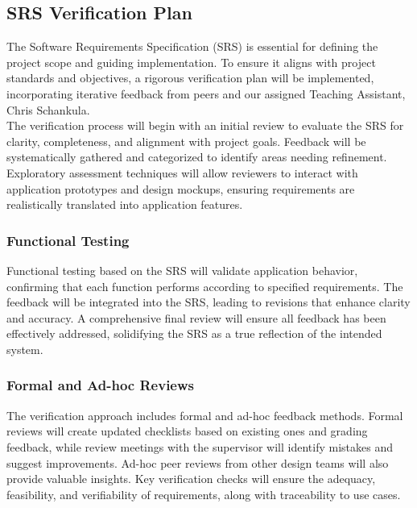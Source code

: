 \documentclass[12pt, titlepage]{article}
\begin{document}
\subsection{SRS Verification Plan}

The Software Requirements Specification (SRS) is essential for defining the project scope and guiding
implementation. To ensure it aligns with project standards and objectives, a rigorous verification
plan will be implemented, incorporating iterative feedback from peers and our assigned Teaching Assistant,
Chris Schankula.\\
\newline
The verification process will begin with an initial review to evaluate the SRS for
clarity, completeness, and alignment with project goals. Feedback will be systematically gathered and
categorized to identify areas needing refinement. Exploratory assessment techniques will allow reviewers
to interact with application prototypes and design mockups, ensuring requirements are realistically
translated into application features.

\subsubsection{Functional Testing}
Functional testing based on the SRS will validate application behavior, confirming that each function
performs according to specified requirements. The feedback will be integrated into the SRS, leading to
revisions that enhance clarity and accuracy. A comprehensive final review will ensure all feedback
has been effectively addressed, solidifying the SRS as a true reflection of the intended system.

\subsubsection{Formal and Ad-hoc Reviews}
The verification approach includes formal and ad-hoc feedback methods. Formal reviews will create
updated checklists based on existing ones and grading feedback, while review meetings with
the supervisor will identify mistakes and suggest improvements. Ad-hoc peer reviews from other design
teams will also provide valuable insights. Key verification checks will ensure the adequacy,
feasibility, and verifiability of requirements, along with traceability to use cases.
\end{document}
